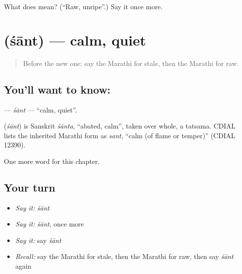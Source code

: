 \begin{tcolorbox}[breakable,colback=teal!4,colframe=teal!35!black,title={Before you move on}]
What does  mean? (\textquotedblleft{}Raw, unripe\textquotedblright{}.) Say it once more.
\end{tcolorbox}
\section[\texorpdfstring{\mr{शांत} (śānt)}{शांत (śānt)}]{ (śānt) — calm, quiet}

\label{lesson:MR-C150-sant}



\begin{quote}
Before the new one: say the Marathi for stale, then the Marathi for raw.
\end{quote}

\subsection*{You'll want to know: }
\textbf{} — \emph{śānt} — \textquotedblleft{}calm, quiet\textquotedblright{}.

\begin{cousinweb}
\textbf{} (\emph{śānt}) is Sanskrit \emph{śānta}, \textquotedblleft{}abated, calm\textquotedblright{}, taken over whole, a tatsama. CDIAL lists the inherited Marathi form as \emph{sant}, \textquotedblleft{}calm (of flame or temper)\textquotedblright{} (CDIAL 12390).
\end{cousinweb}

\begin{grammarlens}[title={What you've built}]
One more word for this chapter.
\end{grammarlens}

\subsection*{Your turn}
\begin{itemize}
\raggedright
  \item \emph{Say it:} \emph{śānt}
  \item \emph{Say it:} \emph{śānt}, once more
  \item \emph{Say it:} say \emph{śānt}
  \item \emph{Recall:} say the Marathi for stale, then the Marathi for raw, then say \emph{śānt} again
\end{itemize}

